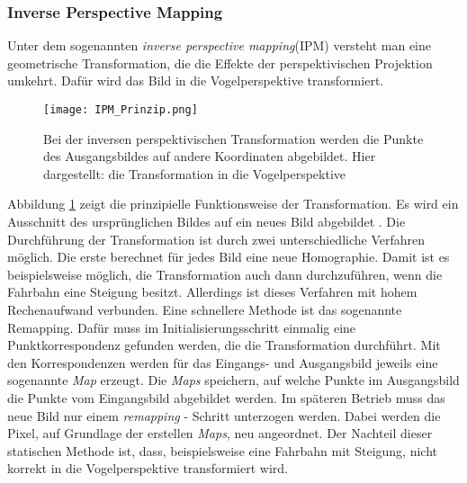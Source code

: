 \subsubsection{Inverse Perspective Mapping}\label{sec:IPM}
Unter dem sogenannten \textit{inverse perspective mapping}(IPM) versteht man eine geometrische Transformation, die die Effekte der perspektivischen Projektion umkehrt. Daf\"ur wird das Bild in die Vogelperspektive transformiert. 
\begin{figure}[ht]
\centering
\texttt{[image: IPM\_Prinzip.png]}
\caption{Bei der inversen perspektivischen Transformation werden die Punkte des Ausgangsbildes auf andere Koordinaten abgebildet. Hier dargestellt: die Transformation in die Vogelperspektive} 
\label{fig:IPM_Prinzip}
\end{figure} Abbildung \ref{fig:IPM_Prinzip} zeigt die prinzipielle Funktionsweise der Transformation. Es wird ein Ausschnitt des urspr\"unglichen Bildes auf ein neues Bild abgebildet \cite{AMM2004}. Die Durchf\"uhrung der Transformation ist durch zwei unterschiedliche Verfahren m\"oglich. Die erste berechnet f\"ur jedes Bild eine neue Homographie. Damit ist es beispielsweise m\"oglich, die Transformation auch dann durchzuf\"uhren, wenn die Fahrbahn eine Steigung besitzt. Allerdings ist dieses Verfahren mit hohem Rechenaufwand verbunden. Eine schnellere Methode ist das sogenannte Remapping. Daf\"ur muss im Initialisierungsschritt einmalig eine Punktkorrespondenz gefunden werden, die die Transformation durchf\"uhrt. Mit den Korrespondenzen werden f\"ur das Eingangs- und Ausgangsbild jeweils eine sogenannte \textit{Map} erzeugt. Die \textit{Maps} speichern, auf welche Punkte im Ausgangsbild die Punkte vom Eingangsbild abgebildet werden. Im sp\"ateren Betrieb muss das neue Bild nur einem \textit{remapping} - Schritt unterzogen werden. Dabei werden die Pixel, auf Grundlage der erstellen \textit{Maps}, neu angeordnet. Der Nachteil dieser statischen Methode ist, dass, beispielsweise eine Fahrbahn mit Steigung, nicht korrekt in die Vogelperspektive transformiert wird.
